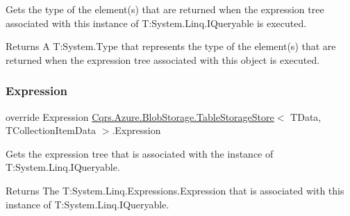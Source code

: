 Gets the type of the element(s) that are returned when the expression tree associated with this instance of T\+:\+System.\+Linq.\+I\+Queryable is executed. 

\begin{DoxyReturn}{Returns}
A T\+:\+System.\+Type that represents the type of the element(s) that are returned when the expression tree associated with this object is executed. 
\end{DoxyReturn}
\mbox{\label{classCqrs_1_1Azure_1_1BlobStorage_1_1TableStorageStore_af7d55541709a0519bdb0b5d201c5a97c_af7d55541709a0519bdb0b5d201c5a97c}} 
\subsubsection{\texorpdfstring{Expression}{Expression}}
{\footnotesize\ttfamily override Expression \hyperlink{classCqrs_1_1Azure_1_1BlobStorage_1_1TableStorageStore}{Cqrs.\+Azure.\+Blob\+Storage.\+Table\+Storage\+Store}$<$ T\+Data, T\+Collection\+Item\+Data $>$.Expression\hspace{0.3cm}{\ttfamily [get]}}



Gets the expression tree that is associated with the instance of T\+:\+System.\+Linq.\+I\+Queryable. 

\begin{DoxyReturn}{Returns}
The T\+:\+System.\+Linq.\+Expressions.\+Expression that is associated with this instance of T\+:\+System.\+Linq.\+I\+Queryable. 
\end{DoxyReturn}
\mbox{\label{classCqrs_1_1Azure_1_1BlobStorage_1_1TableStorageStore_a95c1b0fce651992dd6bd75f44da15829_a95c1b0fce651992dd6bd75f44da15829}} 
